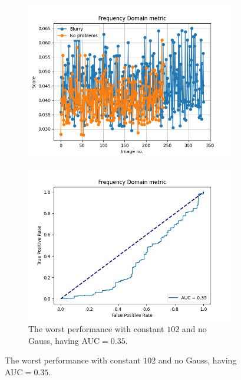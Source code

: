 \begin{figure}[H]
    \centering
    \begin{subfigure}[t]{0.48\textwidth}
        \includegraphics[width=\textwidth]{Figures/tweakFM/102_output_basic_no_gauss.png}
        \caption{}
        \label{fig:FM_basic_102}
    \end{subfigure}\hspace{1em}
    \begin{subfigure}[t]{0.48\textwidth}
        \includegraphics[width=\textwidth]{Figures/tweakFM/102_output_roc_no_gauss.png}
        \caption{The worst performance with constant $102$ and no Gauss, having AUC$=0.35$.}
        \label{fig:FM_roc_102}
    \end{subfigure}\hspace{1em}

\end{figure}
